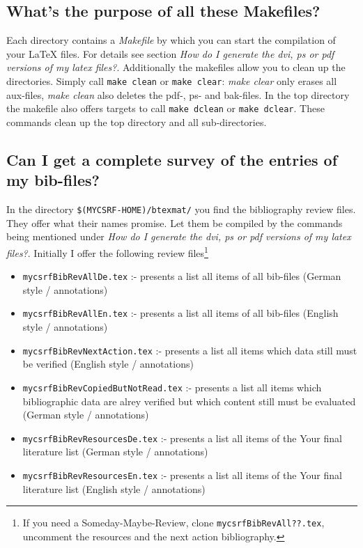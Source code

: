 \documentclass[DIV=calc,BCOR=5mm,11pt,headings=small,oneside,abstract=true, toc=bib]{scrartcl}
\begin{document}
\subsection{What's the purpose of all these Makefiles?}
Each directory contains a \textit{Makefile} by which you can start the
compilation of your LaTeX files. For details see section \textit{How do I
generate the dvi, ps or pdf versions of my latex files?}. Additionally the
makefiles allow you to clean up the directories. Simply call \texttt{make clean}
or \texttt{make clear}: \textit{make clear} only erases all aux-files,
\textit{make clean} also deletes the pdf-, ps- and bak-files. In the top
directory the makefile also offers targets to call \texttt{make
dclean} or \texttt{make dclear}. These commands clean up the top directory and
all sub-directories.

\subsection{Can I get a complete survey of the entries of my bib-files?}
In the directory \texttt{\$(MYCSRF-HOME)/btexmat/} you find the bibliography
review files. They offer what their names promise. Let them be compiled by the
commands being mentioned under \textit{How do I generate the dvi, ps or pdf
versions of my latex files?}. Initially I offer the following review
files\footnote{If you need a Someday-Maybe-Review, clone
\texttt{mycsrfBibRevAll??.tex}, uncomment the resources and the next action
bibliography.}

\begin{itemize}
  \item \texttt{mycsrfBibRevAllDe.tex} :- presents a list all items of all
  bib-files (German style / annotations)
  \item \texttt{mycsrfBibRevAllEn.tex} :- presents a list all items of all
  bib-files (English style / annotations)
  \item \texttt{mycsrfBibRevNextAction.tex} :- presents a list all items 
  which data still must be verified (English style / annotations)
  \item \texttt{mycsrfBibRevCopiedButNotRead.tex} :- presents a list all items 
  which bibliographic data are alrey verified but which content still
  must be evaluated (German style / annotations)
  \item \texttt{mycsrfBibRevResourcesDe.tex} :- presents a list all items of
  the Your final literature list (German style / annotations)
  \item \texttt{mycsrfBibRevResourcesEn.tex} :- presents a list all items of
  the Your final literature list (English style / annotations)
\end{itemize}
\end{document}
